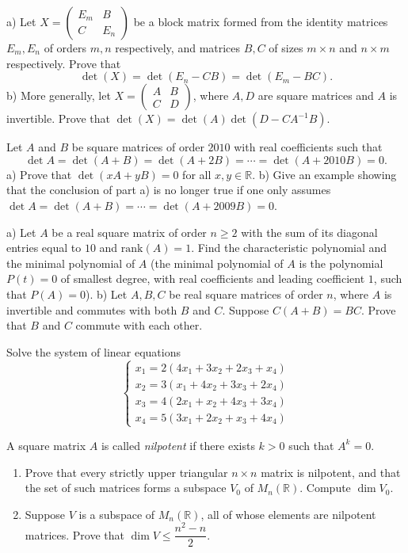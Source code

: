 \documentclass[12pt]{article}
\begin{document}
\begin{problem}
a) Let $X = \begin{pmatrix}E_m & B\\ C & E_n\end{pmatrix}$ be a block matrix formed from the identity matrices $E_m,E_n$ of orders $m,n$ respectively, and matrices $B,C$ of sizes $m\times n$ and $n\times m$ respectively. Prove that
\[ \det(X) = \det(E_n-CB) = \det(E_m-BC). \]
b) More generally, let $X=\begin{pmatrix}A & B\\ C & D\end{pmatrix}$, where $A,D$ are square matrices and $A$ is invertible. Prove that $\det(X)=\det(A)\det(D-CA^{-1}B)$.
\end{problem}

\begin{problem}
Let $A$ and $B$ be square matrices of order $2010$ with real coefficients such that
\[ \det A = \det(A+B) = \det(A+2B) = \cdots = \det(A+2010B) = 0. \]
a) Prove that $\det(xA+yB)=0$ for all $x,y\in\mathbb{R}$. b) Give an example showing that the conclusion of part a) is no longer true if one only assumes $\det A = \det(A+B) = \cdots = \det(A+2009B)=0$.
\end{problem}

\begin{problem}
a) Let $A$ be a real square matrix of order $n\geq 2$ with the sum of its diagonal entries equal to $10$ and $\mathrm{rank}(A)=1$. Find the characteristic polynomial and the minimal polynomial of $A$ (the minimal polynomial of $A$ is the polynomial $P(t)=0$ of smallest degree, with real coefficients and leading coefficient $1$, such that $P(A)=0$). b) Let $A,B,C$ be real square matrices of order $n$, where $A$ is invertible and commutes with both $B$ and $C$. Suppose $C(A+B)=BC$. Prove that $B$ and $C$ commute with each other.
\end{problem}

\begin{problem}
Solve the system of linear equations
\[
\begin{cases}
x_1 = 2(4x_1+3x_2+2x_3+x_4)\\
x_2 = 3(x_1+4x_2+3x_3+2x_4)\\
x_3 = 4(2x_1+x_2+4x_3+3x_4)\\
x_4 = 5(3x_1+2x_2+x_3+4x_4)
\end{cases}
\]
\end{problem}

\begin{problem}
A square matrix $A$ is called \emph{nilpotent} if there exists $k>0$ such that $A^k=0$.
\begin{enumerate}[label=\alph*)]
\item Prove that every strictly upper triangular $n\times n$ matrix is nilpotent, and that the set of such matrices forms a subspace $V_0$ of $M_n(\mathbb{R})$. Compute $\dim V_0$.
\item Suppose $V$ is a subspace of $M_n(\mathbb{R})$, all of whose elements are nilpotent matrices. Prove that $\dim V \leq \dfrac{n^2-n}{2}$.
\end{enumerate}
\end{problem}
\end{document}
